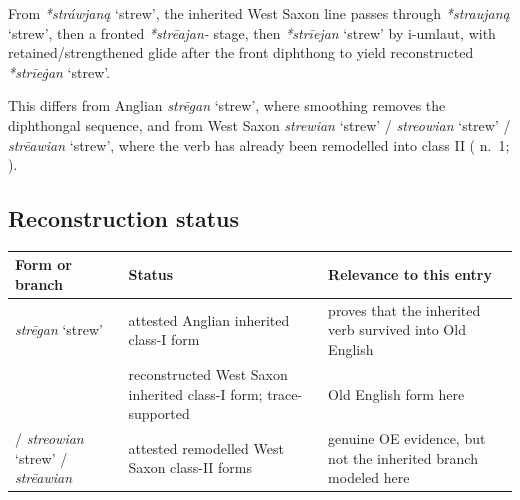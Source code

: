 \documentclass[
  british,
  a4paper,
  openany]{book}
\newcounter{none} %
\providecommand{\Recon}[1]{\emph{*#1}}
{\catcode`→=\active \global\def→{\ensuremath{\rightarrow}}}
\providecommand{\Recon}[1]{\emph{*#1}}
{\catcode`→=\active \global\def→{\ensuremath{\rightarrow}}}
\begin{document}
From \Recon{stráwjaną} `strew', the inherited West Saxon line passes
through \Recon{straujaną} `strew', then a fronted \emph{*strēajan-}
stage, then \Recon{strīejan} `strew' by i-umlaut, with
retained/strengthened glide after the front diphthong to yield
reconstructed \Recon{strīeġan} `strew'.

This differs from Anglian {\emph{strēgan}} `strew', where smoothing
removes the diphthongal sequence, and from West Saxon {\emph{strewian}}
`strew' / {\emph{streowian}} `strew' / {\emph{strēawian}} `strew', where
the verb has already been remodelled into class II
( n.~1;
).

\subsection{Reconstruction status}\label{reconstruction-status-1}

{\def\LTcaptype{none} %
\begin{longtable}[]{@{}
  >{\raggedright\arraybackslash}p{}
  >{\raggedright\arraybackslash}p{}
  >{\raggedright\arraybackslash}p{}@{}}
\toprule\noalign{}
\begin{minipage}[b]{\linewidth}\raggedright
Form or branch
\end{minipage} & \begin{minipage}[b]{\linewidth}\raggedright
Status
\end{minipage} & \begin{minipage}[b]{\linewidth}\raggedright
Relevance to this entry
\end{minipage} \\
\midrule\noalign{}
\endhead
\bottomrule\noalign{}
\endlastfoot
{\emph{strēgan}} `strew' & attested Anglian inherited class-I form &
proves that the inherited verb survived into Old English \\
{\emph{\Recon{strīeġan} `strew'}} & reconstructed West Saxon inherited
class-I form; trace-supported & Old English form here \\
{\emph{strewian}} / {\emph{streowian}} `strew' / {\emph{strēawian}} &
attested remodelled West Saxon class-II forms & genuine OE evidence, but
not the inherited branch modeled here \\
\end{longtable}
}
\end{document}

